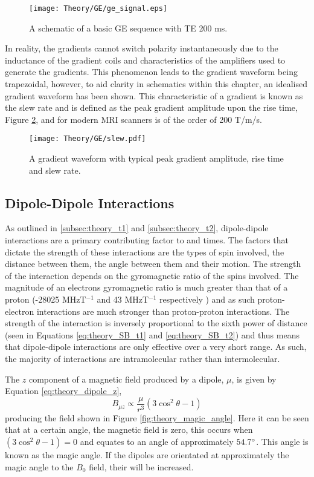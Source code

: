 \begin{figure}[H]
	\centering
	\texttt{[image: Theory/GE/ge\_signal.eps]}
	\caption{A schematic of a basic \acf{GE} sequence with \ac{TE} 200 ms.}
	\label{fig:theory_ge_signal}	
\end{figure}

In reality, the gradients cannot switch polarity instantaneously due to the inductance of the gradient coils and characteristics of the amplifiers used to generate the gradients. This phenomenon leads to the gradient waveform being trapezoidal, however, to aid clarity in schematics within this chapter, an idealised gradient waveform has been shown. This characteristic of a gradient is known as the slew rate and is defined as the peak gradient amplitude upon the rise time, Figure \ref{fig:theory_slew}, and for modern \ac{MRI} scanners is of the order of 200 T/m/s.

\begin{figure}[H]
	\centering
	\texttt{[image: Theory/GE/slew.pdf]}
	\caption{A gradient waveform with typical peak gradient amplitude, rise time and slew rate.}
	\label{fig:theory_slew}	
\end{figure}

\subsection{Dipole-Dipole Interactions}
\label{subsec:theory_dipole_dipole_interactions}
As outlined in \ref{subsec:theory_t1} and \ref{subsec:theory_t2}, dipole-dipole interactions are a primary contributing factor to \tone and \ttwo times. The factors that dictate the strength of these interactions are the types of spin involved, the distance between them, the angle between them and their motion. The strength of the interaction depends on the gyromagnetic ratio of the spins involved. The magnitude of an electrons gyromagnetic ratio is much greater than that of a proton (-28025 MHzT$^{-1}$ and 43 MHzT$^{-1}$ respectively \cite{mohr_codata_2016}) and as such proton-electron interactions are much stronger than proton-proton interactions. The strength of the interaction is inversely proportional to the sixth power of distance (seen in Equations \eqref{eq:theory_SB_t1} and \eqref{eq:theory_SB_t2}) and thus means that dipole-dipole interactions are only effective over a very short range. As such, the majority of interactions are intramolecular rather than intermolecular.

The $z$ component of a magnetic field produced by a dipole, $\mu$, is given by Equation \ref{eq:theory_dipole_z},
\begin{equation}
	B_{\mu z} \propto \frac{\mu}{r^3}\left( 3\cos^2\theta -1\right) 
	\label{eq:theory_dipole_z}
\end{equation}
producing the field shown in Figure \ref{fig:theory_magic_angle}. Here it can be seen that at a certain angle, the magnetic field is zero, this occurs when $\left( 3\cos^2\theta -1\right) = 0$ and equates to an angle of approximately $54.7\degree$. This angle is known as the magic angle. If the dipoles are orientated at approximately the magic angle to the $B_0$ field, their \ttwo will be increased.



